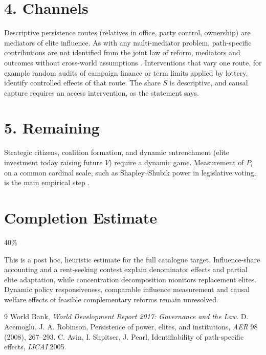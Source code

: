 \documentclass[11pt]{article}
\theoremstyle{definition}
\begin{document}
\section*{4. Channels}
Descriptive persistence routes (relatives in office, party control, ownership) are mediators of elite influence. As with
any multi-mediator problem, path-specific contributions are not identified from the joint law of reform, mediators and
outcomes without cross-world assumptions \cite{asp}. Interventions that vary one route, for example random audits of
campaign finance or term limits applied by lottery, identify controlled effects of that route. The share $S$ is descriptive,
and causal capture requires an access intervention, as the statement says.

\section*{5. Remaining}
Strategic citizens, coalition formation, and dynamic entrenchment (elite investment today raising future $V$) require a
dynamic game. Measurement of $P_i$ on a common cardinal scale, such as Shapley--Shubik power in legislative voting, is the main
empirical step \cite{wdr}.

\section{Completion Estimate}
40\%

This is a post hoc, heuristic estimate for the full catalogue target.
Influence-share accounting and a rent-seeking contest explain denominator effects and partial elite adaptation, while concentration decomposition monitors replacement elites. Dynamic policy responsiveness, comparable influence measurement and causal welfare effects of feasible complementary reforms remain unresolved.

\begin{thebibliography}{9}
 World Bank, \emph{World Development Report 2017: Governance and the Law}.
 D. Acemoglu, J. A. Robinson, Persistence of power, elites, and institutions, \emph{AER} 98 (2008), 267--293.
 C. Avin, I. Shpitser, J. Pearl, Identifiability of path-specific effects, \emph{IJCAI} 2005.
\end{thebibliography}
\end{document}
